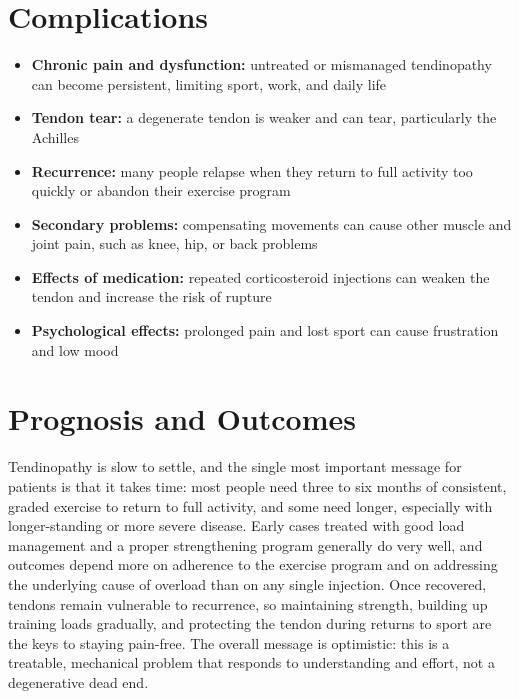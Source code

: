 \section*{Complications}
\begin{itemize}
    \item \textbf{Chronic pain and dysfunction:} untreated or mismanaged tendinopathy can become persistent, limiting sport, work, and daily life
    \item \textbf{Tendon tear:} a degenerate tendon is weaker and can tear, particularly the Achilles
    \item \textbf{Recurrence:} many people relapse when they return to full activity too quickly or abandon their exercise program
    \item \textbf{Secondary problems:} compensating movements can cause other muscle and joint pain, such as knee, hip, or back problems
    \item \textbf{Effects of medication:} repeated corticosteroid injections can weaken the tendon and increase the risk of rupture
    \item \textbf{Psychological effects:} prolonged pain and lost sport can cause frustration and low mood
\end{itemize}

\section*{Prognosis and Outcomes}
Tendinopathy is slow to settle, and the single most important message for patients is that it takes time: most people need three to six months of consistent, graded exercise to return to full activity, and some need longer, especially with longer-standing or more severe disease. Early cases treated with good load management and a proper strengthening program generally do very well, and outcomes depend more on adherence to the exercise program and on addressing the underlying cause of overload than on any single injection. Once recovered, tendons remain vulnerable to recurrence, so maintaining strength, building up training loads gradually, and protecting the tendon during returns to sport are the keys to staying pain-free. The overall message is optimistic: this is a treatable, mechanical problem that responds to understanding and effort, not a degenerative dead end.

